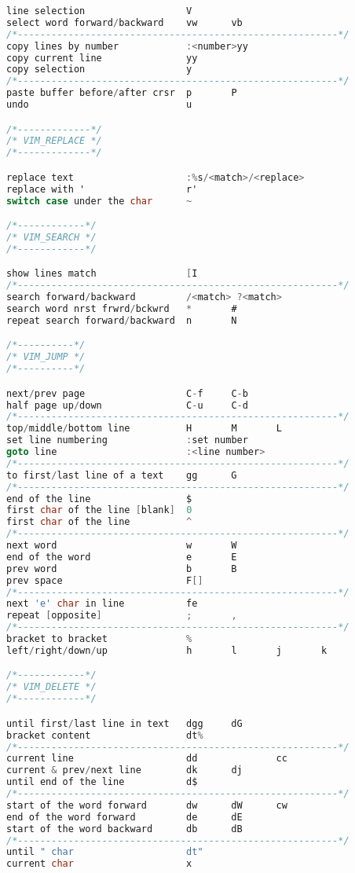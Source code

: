 \documentclass[8pt]{extarticle}
\begin{document}
\begin{small}
\begin{multicols}{2}
\begin{lstlisting}[language=C]
line selection					V
select word forward/backward 	vw		vb
/*---------------------------------------------------------*/
copy lines by number			:<number>yy
copy current line				yy
copy selection					y
/*---------------------------------------------------------*/
paste buffer before/after crsr	p		P
undo							u

/*-------------*/
/* VIM_REPLACE */
/*-------------*/

replace text					:%s/<match>/<replace>
replace with '					r'
switch case under the char		~

/*------------*/
/* VIM_SEARCH */
/*------------*/

show lines match				[I
/*---------------------------------------------------------*/
search forward/backward			/<match> ?<match>
search word nrst frwrd/bckwrd	*		#
repeat search forward/backward	n		N

/*----------*/
/* VIM_JUMP */
/*----------*/

next/prev page					C-f		C-b
half page up/down				C-u		C-d
/*---------------------------------------------------------*/
top/middle/bottom line			H		M		L
set line numbering				:set number
goto line						:<line number>
/*---------------------------------------------------------*/
to first/last line of a text 	gg		G
/*---------------------------------------------------------*/
end of the line					$	
first char of the line [blank]	0
first char of the line			^
/*---------------------------------------------------------*/
next word						w		W
end of the word 				e		E
prev word						b		B
prev space						F[]
/*---------------------------------------------------------*/
next 'e' char in line			fe
repeat [opposite]				;		,
/*---------------------------------------------------------*/
bracket to bracket				%
left/right/down/up				h		l		j		k

/*------------*/
/* VIM_DELETE */
/*------------*/

until first/last line in text	dgg		dG
bracket content					dt%
/*---------------------------------------------------------*/
current line					dd				cc
current & prev/next line 		dk		dj
until end of the line			d$
/*---------------------------------------------------------*/
start of the word forward		dw		dW		cw
end of the word forward	 		de		dE
start of the word backward		db		dB
/*---------------------------------------------------------*/
until " char					dt"
current	char					x

\end{lstlisting}

\vfill\null


\end{multicols}
\end{small}
\end{document}
